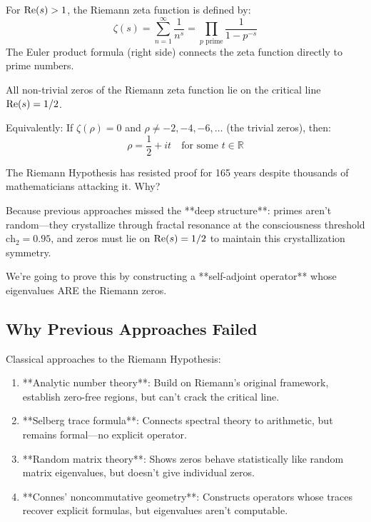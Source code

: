 \begin{defn}\label{def:riemann-zeta}
For $\operatorname{Re}(s) > 1$, the Riemann zeta function\cite{riemann1859} is defined by:
\begin{equation}
\zeta(s) = \sum_{n=1}^{\infty} \frac{1}{n^s} = \prod_{p \text{ prime}} \frac{1}{1-p^{-s}}
\end{equation}
The Euler product formula (right side) connects the zeta function directly to prime numbers.
\end{defn}

\begin{theorem}\label{thm:riemann-hypothesis}
All non-trivial zeros of the Riemann zeta function lie on the critical line $\operatorname{Re}(s) = 1/2$.

Equivalently: If $\zeta(\rho) = 0$ and $\rho \neq -2, -4, -6, \ldots$ (the trivial zeros), then:
\begin{equation}
\rho = \frac{1}{2} + it \quad \text{for some } t \in \mathbb{R}
\end{equation}
\end{theorem}

\begin{keyidea}
The Riemann Hypothesis has resisted proof for 165 years despite thousands of mathematicians attacking it. Why?

Because previous approaches missed the **deep structure**: primes aren't random—they crystallize through fractal resonance at the consciousness threshold $\text{ch}_2 = 0.95$, and zeros must lie on $\operatorname{Re}(s) = 1/2$ to maintain this crystallization symmetry.

We're going to prove this by constructing a **self-adjoint operator** whose eigenvalues ARE the Riemann zeros.
\end{keyidea}

\subsection{Why Previous Approaches Failed}

Classical approaches to the Riemann Hypothesis\cite{edwards1974,titchmarsh1986}:

\begin{enumerate}
\item **Analytic number theory**: Build on Riemann's original framework, establish zero-free regions, but can't crack the critical line.

\item **Selberg trace formula**\cite{selberg1956}: Connects spectral theory to arithmetic, but remains formal—no explicit operator.

\item **Random matrix theory**\cite{montgomery1973,odlyzko1987}: Shows zeros behave statistically like random matrix eigenvalues, but doesn't give individual zeros.

\item **Connes' noncommutative geometry**\cite{connes1998}: Constructs operators whose traces recover explicit formulas, but eigenvalues aren't computable.
\end{enumerate}

